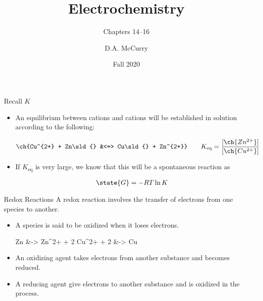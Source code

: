 \documentclass[notes=only]{beamer}
\title{Electrochemistry}
\subtitle{Chapters 14--16}
\institute{CHEM321 --- Analytical Chemistry I \\ Bloomsburg University}
\author{D.A. McCurry}
\date{Fall 2020}
\begin{document}
\maketitle
{}


\begin{frame}{Recall $K$}
	\begin{itemize}
		\item An equilibrium between  cations and
			 cations will be established in solution
			according to the following:

			\begin{align*}
				\ch{Cu^{2+} + Zn\sld{} &<=> Cu\sld{} + Zn^{2+}}
				\qquad K_{\text{eq}} =
				\frac{[\ch{Zn^{2+}}]}{[\ch{Cu^{2+}}]}
			\end{align*}
		
		\item If $K_\text{eq}$ is very large, we know that this will be
			a spontaneous reaction as

			\begin{align*}
				\state{G} = -RT \ln K
			\end{align*}
	\end{itemize}
\end{frame}

\begin{frame}{Redox Reactions}
	A \alert{redox reaction} involves the transfer of electrons from one
	species to another.
\begin{itemize}
		\item A species is said to be \alert{oxidized} when it
			\alert{loses} electrons.
			\begin{reactions*}
				Zn\sld{} &-> Zn^{2+} + 2 \el
				Cu^{2+} + 2 \el{} &-> Cu\sld
			\end{reactions*}
		\item An \alert{oxidizing agent} takes electrons from another
			substance and becomes \alert{reduced}.
		\item A \alert{reducing agent} give electrons to another
			substance and is \alert{oxidized} in the process.
	\end{itemize}
\end{frame}
\end{document}
